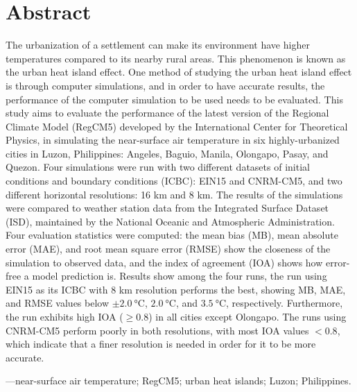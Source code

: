 \chapter*{Abstract}

The urbanization of a settlement can make its environment have higher temperatures compared to its nearby rural areas.
This phenomenon is known as the urban heat island effect.
One method of studying the urban heat island effect is through computer simulations, and in order to have accurate results, the performance of the computer simulation to be used needs to be evaluated.
This study aims to evaluate the performance of the latest version of the Regional Climate Model (RegCM5) developed by the International Center for Theoretical Physics, in simulating the near-surface air temperature in six highly-urbanized cities in Luzon, Philippines: Angeles, Baguio, Manila, Olongapo, Pasay, and Quezon.
Four simulations were run with two different datasets of initial conditions and boundary conditions (ICBC): EIN15 and CNRM-CM5, and two different horizontal resolutions: 16 km and 8 km. The results of the simulations were compared to weather station data from the Integrated Surface Dataset (ISD), maintained by the National Oceanic and Atmospheric Administration.
Four evaluation statistics were computed: the mean bias (MB), mean absolute error (MAE), and root mean square error (RMSE) show the closeness of the simulation to observed data, and the index of agreement (IOA) shows how error-free a model prediction is.
Results show among the four runs, the run using EIN15 as its ICBC with 8 km resolution performs the best, showing MB, MAE, and RMSE values below $\pm \qty{2.0}{\degreeCelsius}$, $\qty{2.0}{\degreeCelsius}$, and $\qty{3.5}{\degreeCelsius}$, respectively.
Furthermore, the run exhibits high IOA ($\geq \num{0.8}$) in all cities except Olongapo. The runs using CNRM-CM5 perform poorly in both resolutions, with most IOA values $< \num{0.8}$, which indicate that a finer resolution is needed in order for it to be more accurate.

\vspace{3ex} ---near-surface air temperature; RegCM5; urban heat islands; Luzon; Philippines.

%
